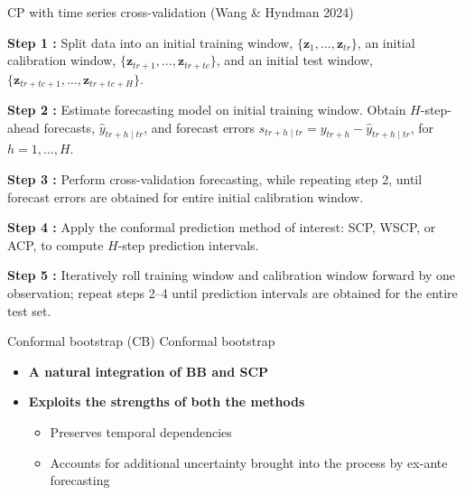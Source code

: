 \documentclass[
  12pt,
  ignorenonframetext,
  aspectratio=169,
]{beamer}
\begin{document}
\begin{frame}{CP with time series cross-validation (Wang \& Hyndman
2024)}
\label{cp-with-time-series-cross-validation-wang-hyndman-2024-1}
\begin{block}{}
\fontsize{9}{9}\sf
\color{blue} \textbf{Step 1 :} \color{black} Split data into an initial training window, $\{\bm{z}_{1}, \dots, \bm{z}_{tr}\}$, an initial calibration window, $\{\bm{z}_{tr + 1}, \dots, \bm{z}_{tr + tc}\}$, and an initial test window, $\{\bm{z}_{tr + tc + 1}, \dots, \bm{z}_{tr + tc + H}\}$.
\end{block}

\begin{block}{}
\fontsize{9}{9}\sf
\color{violet} \textbf{Step 2 :} \color{black} Estimate forecasting model on initial training window. Obtain $H$-step-ahead forecasts, $\hat{y}_{tr + h \mid tr}$, and forecast errors $s_{tr + h \mid tr} = y_{tr + h} - \hat{y}_{tr + h \mid tr}$, for $h = 1, \dots, H$.
\end{block}

\begin{block}{}
\fontsize{9}{9}\sf
\color{blue} \textbf{Step 3 :} \color{black} Perform cross-validation forecasting, while repeating step 2, until forecast errors are obtained for entire initial calibration window.
\end{block}

\begin{block}{}
\fontsize{9}{9}\sf
\color{violet} \textbf{Step 4 :} \color{black} Apply the conformal prediction method of interest: SCP, WSCP, or ACP, to compute $H$-step prediction intervals.
\end{block}

\begin{block}{}
\fontsize{9}{9}\sf
\color{blue} \textbf{Step 5 :} \color{black} Iteratively roll training window and calibration window forward by one observation; repeat steps 2--4 until prediction intervals are obtained for the entire test set. 
\end{block}
\end{frame}

\begin{frame}{Conformal bootstrap (CB)}
\label{conformal-bootstrap-cb}
\alert{Conformal bootstrap}

\begin{itemize}
  \item \textbf{A natural integration of BB and SCP} \newline
  \item \textbf{Exploits the strengths of both the methods} \newline
  \begin{itemize}
  \item \color{violet} Preserves temporal dependencies  \newline
  \item \color{violet} Accounts for additional uncertainty brought into the process by ex-ante forecasting
\end{itemize}
\end{itemize}
\end{frame}
\end{document}

